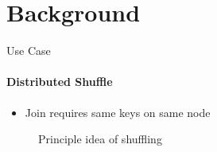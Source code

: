 \documentclass[
	ngerman,%
	aspectratio=169,%
	color={accentcolor=8c},
	logo=true,%
	colorframetitle=true,%
    authorontitle=true,
	]{tudabeamer}
\begin{document}
\section{Background}

\begin{frame}{Use Case}
\framesubtitle{Distributed Shuffle}

\begin{itemize}
    \item Join requires same keys on same node
\end{itemize}

\begin{figure}
    \centering
    \begin{tikzpicture}[x=0.5pt,y=0.5pt,scale=1]
        
    \end{tikzpicture}

    \caption{Principle idea of shuffling}
\end{figure}




\end{frame}
\end{document}
